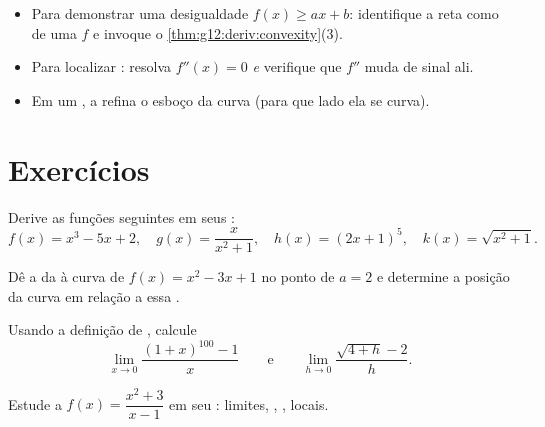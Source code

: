 \begin{method}\label{met:g12:deriv:convexity}
\begin{itemize}
  \item Para demonstrar uma desigualdade $f(x) \geq ax + b$: identifique a
        reta como  de uma $f$  e invoque o
        \cref{thm:g12:deriv:convexity}(3).
  \item Para localizar : resolva $f''(x) = 0$ \emph{e}
        verifique que $f''$ muda de sinal ali.
  \item Em um , a  refina o esboço da curva
        (para que lado ela se curva).
\end{itemize}
\end{method}

\section{Exercícios}

\begin{exercise}[$\star$]\label{exo:g12:deriv:1}
Derive as funções seguintes em seus :
\[
f(x) = x^3 - 5x + 2, \quad
g(x) = \frac{x}{x^2+1}, \quad
h(x) = (2x+1)^5, \quad
k(x) = \sqrt{x^2 + 1}.
\]
\end{exercise}

\begin{exercise}[$\star$]\label{exo:g12:deriv:2}
Dê a  da  à curva de $f(x) = x^2 - 3x + 1$ no ponto de
 $a = 2$ e determine a posição da curva em relação a essa
.
\end{exercise}

\begin{exercise}[$\star$]\label{exo:g12:deriv:3}
Usando a definição de , calcule
\[
\lim_{x \to 0} \frac{(1+x)^{100} - 1}{x}
\qquad\text{e}\qquad
\lim_{h \to 0} \frac{\sqrt{4+h} - 2}{h}.
\]
\end{exercise}

\begin{exercise}[$\star\star$]\label{exo:g12:deriv:4}
Estude a  $f(x) = \dfrac{x^2 + 3}{x - 1}$ em seu : limites,
, ,  locais.
\end{exercise}

